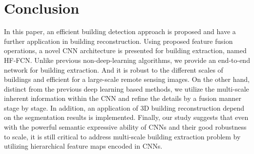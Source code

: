 \section{Conclusion}
\label{Sec:Con}
 In this paper, an efficient building detection approach is proposed and have a further application in building reconstruction.
 Using proposed feature fusion operations, a novel CNN architecture is presented for building extraction, named HF-FCN.
 Unlike previous non-deep-learning algorithms, we provide an end-to-end network for building extraction.
 And it is robust to the different scales of buildings and efficient for a large-scale remote sensing images.
 On the other hand, distinct from the previous deep learning based methods, we utilize the multi-scale inherent information within the CNN and refine the details by a fusion manner stage by stage.
 In addition, an application of 3D building reconstruction depend on the segmentation results is implemented.
 Finally, our study suggests that even with the powerful semantic expressive ability of CNNs and their good robustness to scale, it is still critical to address multi-scale building extraction problem by utilizing hierarchical feature maps encoded in CNNs.

